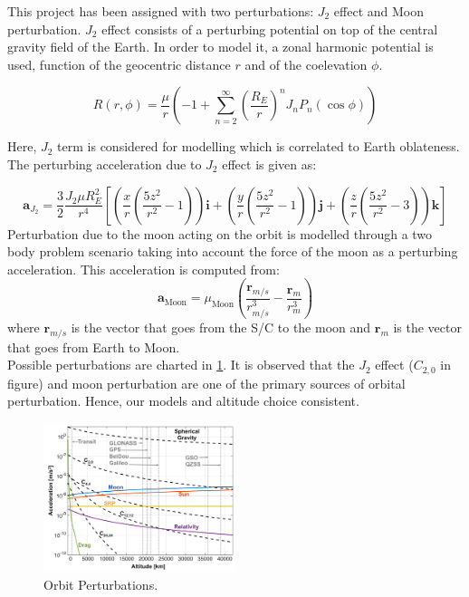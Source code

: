 \documentclass{article}
\begin{document}
This project has been assigned with two perturbations: \( J_2 \) effect and Moon perturbation. \( J_2 \) effect consists of a perturbing potential on top of the central gravity field of the Earth. In order to model it, a zonal harmonic potential is used, function of the geocentric distance \( r \) and of the coelevation \( \phi \).

\begin{equation*}
	R(r, \phi) = \frac{\mu}{r} \left( -1 + \sum_{n=2}^{\infty} \left( \frac{R_E}{r} \right)^n J_n P_n(\cos\phi) \right)
\end{equation*}

Here, \( J_2 \) term is considered for modelling which is correlated to Earth oblateness. The perturbing acceleration due to \( J_2 \) effect is given as:

\begin{equation*}
	\mathbf{a}_{J_2} = \frac{3}{2} \frac{J_2 \mu R_E^2}{r^4} \left[ \left( \frac{x}{r} \left( \frac{5z^2}{r^2} - 1 \right) \right) \mathbf{i} + \left( \frac{y}{r} \left( \frac{5z^2}{r^2} - 1 \right) \right) \mathbf{j} + \left( \frac{z}{r} \left( \frac{5z^2}{r^2} - 3 \right) \right) \mathbf{k} \right]
\end{equation*}
Perturbation due to the moon acting on the orbit is modelled through a two body problem scenario taking into account the force of the moon as a perturbing acceleration. This acceleration is computed from:
\begin{equation*}
	\label{eq:moon_perturbation}
	\mathbf{a}_{\text{Moon}} = \mu_{\text{Moon}}
	\left( \frac{\mathbf{r}_{m/s}}{r_{m/s}^3} - \frac{\mathbf{r}_m}{r_m^3} \right)
\end{equation*}
where \( \mathbf{r}_{m/s} \) is the vector that goes from the S/C to the moon and \( \mathbf{r}_m \) is the vector that goes from Earth to Moon.\\ 

Possible perturbations are charted in \ref{fig:orbit perturbations}. It is observed that the \( J_2 \) effect (\( C_{2,0} \) in figure) and moon perturbation are one of the primary sources of orbital perturbation. Hence, our models and altitude choice consistent.   

\begin{figure}[H]
	\centering
	\includegraphics[width=0.5\textwidth]{Perturbation chart.png}
	\caption{Orbit Perturbations.}
	\label{fig:orbit perturbations}
\end{figure}
\end{document}
